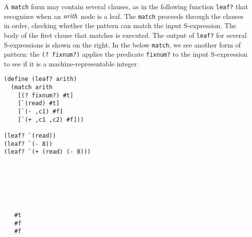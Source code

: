 \documentclass[12pt]{book}
\begin{document}
A \texttt{match} form may contain several clauses, as in the following
function \texttt{leaf?} that recognizes when an $\mathit{arith}$ node is
a leaf. The \texttt{match} proceeds through the clauses in order,
checking whether the pattern can match the input S-expression. The
body of the first clause that matches is executed. The output of
\texttt{leaf?} for several S-expressions is shown on the right. In the
below \texttt{match}, we see another form of pattern: the \texttt{(?
  fixnum?)} applies the predicate \texttt{fixnum?} to the input
S-expression to see if it is a machine-representable integer.
\begin{center}
\begin{minipage}{0.5\textwidth}
\begin{lstlisting}
(define (leaf? arith)
  (match arith
    [(? fixnum?) #t]
    [`(read) #t]
    [`(- ,c1) #f]
    [`(+ ,c1 ,c2) #f]))

(leaf? `(read))
(leaf? `(- 8))
(leaf? `(+ (read) (- 8)))
\end{lstlisting}
\end{minipage}
\vrule
\begin{minipage}{0.25\textwidth}
\begin{lstlisting}






   #t
   #f
   #f
\end{lstlisting}
\end{minipage}
\end{center}



\end{document}
